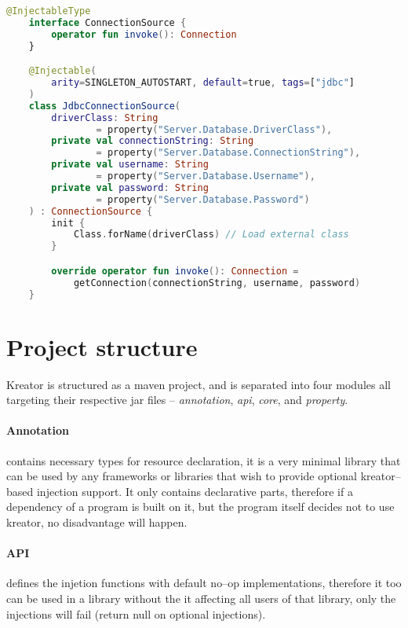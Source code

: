 		\begin{center}
			\begin{minipage}{14cm}
		\begin{lstlisting}[language=Kotlin, title={\emph{Example usage} -- \code{dbConnection.kt}}]
	@InjectableType
	interface ConnectionSource {
		operator fun invoke(): Connection
	}

	@Injectable(
		arity=SINGLETON_AUTOSTART, default=true, tags=["jdbc"]
	)
	class JdbcConnectionSource(
		driverClass: String
				= property("Server.Database.DriverClass"),
        private val connectionString: String
        		= property("Server.Database.ConnectionString"),
        private val username: String
        		= property("Server.Database.Username"),
        private val password: String
        		= property("Server.Database.Password")
	) : ConnectionSource {
		init {
	        Class.forName(driverClass) // Load external class
	    }

	    override operator fun invoke(): Connection =
	    	getConnection(connectionString, username, password)
	}
		\end{lstlisting}
			\end{minipage}
		\end{center}
	
	\section{Project structure}
	
	Kreator is structured as a maven project, and is separated into four modules all targeting their respective jar files -- \emph{annotation}, \emph{api}, \emph{core}, and \emph{property}.
	
	\paragraph{Annotation} contains necessary types for resource declaration, it is a very minimal library that can be used by any frameworks or libraries that wish to provide optional kreator--based injection support. It only contains declarative parts, therefore if a dependency of a program is built on it, but the program itself decides not to use kreator, no disadvantage will happen.
	
	\paragraph{API} defines the injetion functions with default no--op implementations, therefore it too can be used in a library without the it affecting all users of that library, only the injections will fail (return null on optional injections).
	
